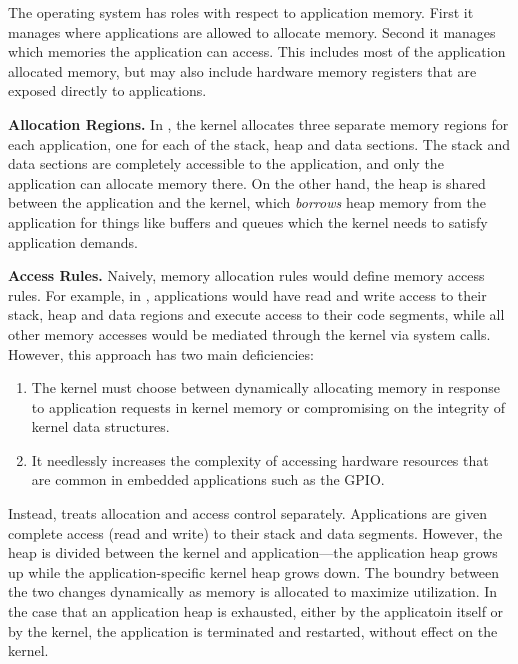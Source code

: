 The operating system has roles with respect to application memory. First it
manages where applications are allowed to allocate memory. Second it manages
which memories the application can access. This includes most of the application
allocated memory, but may also include hardware memory registers that are
exposed directly to applications.

{\bf Allocation Regions.} 
In \name, the kernel allocates three separate memory regions for each
application, one for each of the stack, heap and data sections. The stack and
data sections are completely accessible to the application, and only the
application can allocate memory there. On the other hand, the heap is shared
between the application and the kernel, which \emph{borrows} heap memory from
the application for things like buffers and queues which the kernel needs
to satisfy application demands.

{\bf Access Rules.}
Naively, memory allocation rules would define memory access rules. For example,
in \name, applications would have read and write access to their stack, heap and
data regions and execute access to their code segments, while all other memory
accesses would be mediated through the kernel via system calls. However, this
approach has two main deficiencies:

\begin{enumerate}
  \item The kernel must choose between dynamically allocating memory in response to
  application requests in kernel memory or compromising on the integrity of
  kernel data structures.

  \item It needlessly increases the complexity of accessing hardware resources
  that are common in embedded applications such as the GPIO.

\end{enumerate}

Instead, \name treats allocation and access control separately. Applications are
given complete access (read and write) to their stack and data segments.
However, the heap is divided between the kernel and application---the
application heap grows up while the application-specific kernel heap grows down.
The boundry between the two changes dynamically as memory is allocated to
maximize utilization. In the case that an application heap is exhausted, either
by the applicatoin itself or by the kernel, the application is terminated and
restarted, without effect on the kernel.

